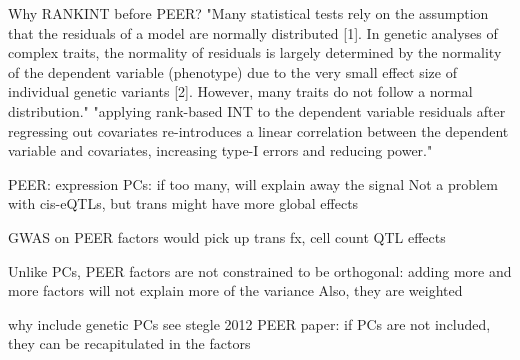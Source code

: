 
Why RANKINT before PEER?
"Many statistical tests rely on the assumption that the residuals of a model are normally distributed [1]. In genetic analyses of complex traits, the normality of residuals is largely determined by the normality of the dependent variable (phenotype) due to the very small effect size of individual genetic variants [2]. However, many traits do not follow a normal distribution."
"applying rank-based INT to the dependent variable residuals after regressing out covariates re-introduces a linear correlation between the dependent variable and covariates, increasing type-I errors and reducing power."

PEER:
expression PCs: if too many, will explain away the signal
Not a problem with cis-eQTLs, but trans might have more global effects

    GWAS on PEER factors would pick up trans fx, cell count QTL effects

Unlike PCs, PEER factors are not constrained to be orthogonal: adding more and more factors will not explain more of the variance
    Also, they are weighted

why include genetic PCs
see stegle 2012 PEER paper: if PCs are not included, they can be recapitulated in the factors

